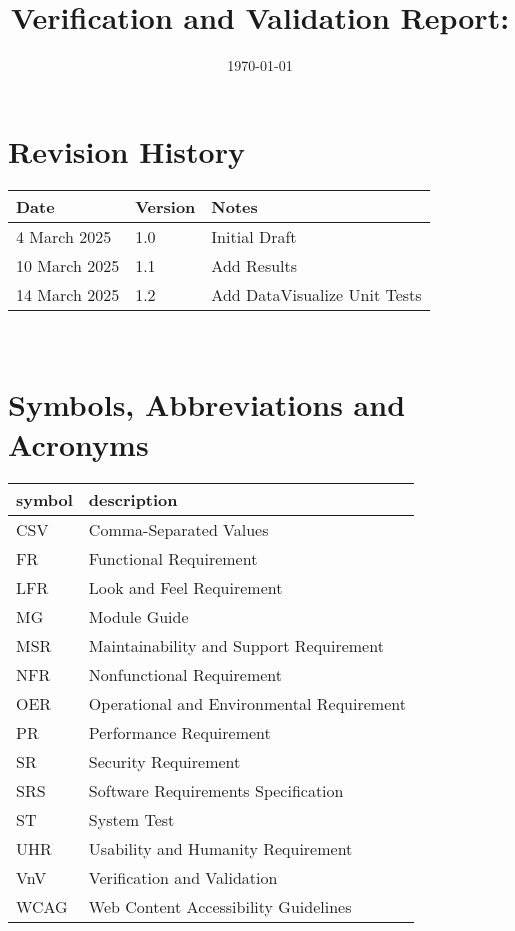 \documentclass[12pt, titlepage]{article}
\begin{document}
\title{Verification and Validation Report: \progname} 
\author{\authname}
\date{\today}
	
\maketitle


\section{Revision History}

\begin{tabularx}{\textwidth}{p{3cm}p{2cm}X} \toprule {\bf Date} & {\bf Version}
& {\bf Notes}\\
\midrule
4 March 2025 & 1.0 & Initial Draft\\
10 March 2025 & 1.1 & Add Results\\
14 March 2025 & 1.2 & Add DataVisualize Unit Tests\\
\bottomrule
\end{tabularx}

~\newpage

\section{Symbols, Abbreviations and Acronyms}

\renewcommand{\arraystretch}{1.2}
\begin{tabular}{l l} 
  \toprule		
  \textbf{symbol} & \textbf{description}\\
  \midrule
  CSV & Comma-Separated Values\\
  FR & Functional Requirement\\
  LFR & Look and Feel Requirement\\
  MG & Module Guide\\
  MSR & Maintainability and Support Requirement\\
  NFR & Nonfunctional Requirement\\
  OER & Operational and Environmental Requirement\\
  PR & Performance Requirement\\
  SR & Security Requirement\\
  SRS & Software Requirements Specification\\
  ST & System Test\\
  UHR & Usability and Humanity Requirement\\
  VnV & Verification and Validation\\
  WCAG & Web Content Accessibility Guidelines\\
  \bottomrule
\end{tabular}\\
\end{document}
